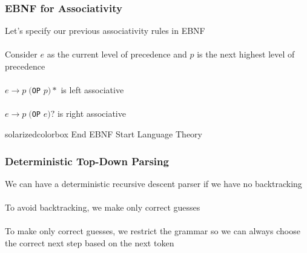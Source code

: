 \documentclass[aspectratio=169]{beamer}
\begin{document}
\begin{frame}
\frametitle{EBNF for Associativity}

Let's specify our previous associativity rules in EBNF\\~\\

Consider $e$ as the current level of precedence and $p$ is the next highest
level of precedence\\~\\

$e \rightarrow p \;($\lstinline{OP} $p )*$ is left associative\\~\\

$e \rightarrow p \;($\lstinline{OP} $e )?$ is right associative
\end{frame}

\begin{frame}
  \begin{beamercolorbox}[wd=\paperwidth, sep=2em]{solarizedcolorbox}
    { End EBNF \hfill Start
      Language Theory}
  \end{beamercolorbox}
\end{frame}

\begin{frame}
\frametitle{Deterministic Top-Down Parsing}

We can have a deterministic recursive descent parser if we have no backtracking
\\~\\

To avoid backtracking, we make only correct guesses\\~\\

To make only correct guesses, we restrict the grammar so we can always choose
the correct next step based on the next token
\end{frame}
\end{document}
